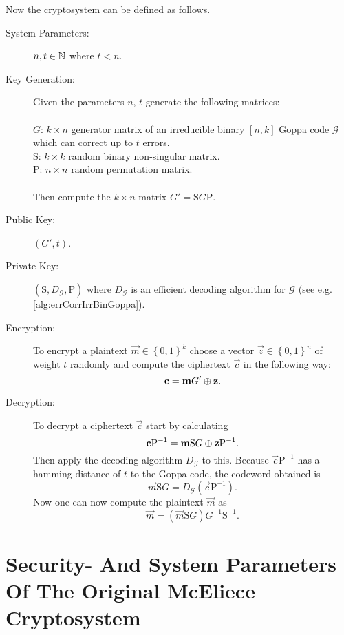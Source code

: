 Now the cryptosystem can be defined as follows.
\begin{description}
	\item[System Parameters:] $n, t \in \mathbb{N}$ where $t < n$.
	\item[Key Generation:] Given the parameters $n$, $t$ generate the following matrices:
	\\~\\
		$G$: $k \times n$ generator matrix of an irreducible binary $\left[n,k\right]$ Goppa code $\mathcal{G}$ which can correct up to $t$ errors.\\
		$\mathrm{S}$: $k \times k$ random binary non-singular matrix.\\
		$\mathrm{P}$: $n \times n$ random permutation matrix.
		\\~\\
		Then compute the $k \times n$ matrix $G' = \mathrm{S}G\mathrm{P}$.
	\item[Public Key:] $\left(G',t\right)$.
	\item[Private Key:] $\left(\mathrm{S}, D_{\mathcal{G}}, \mathrm{P}\right)$ where $D_{\mathcal{G}}$ is an efficient decoding algorithm for $\mathcal{G}$ (see e.g. \cref{alg:errCorrIrrBinGoppa}).
	\item[Encryption:] To encrypt a plaintext $\vec{m} \in \left\{ 0,1 \right\} ^k$ choose a vector $\vec{z} \in \left\{ 0,1 \right\} ^n$ of weight $t$ randomly and compute the ciphertext $\vec{c}$ in the following way:
		\begin{equation}
		\label{eq:mcEEncryption}
			\boldsymbol{\mathrm{c}} = \boldsymbol{\mathrm{m}} G' \mathbin{\oplus} \boldsymbol{\mathrm{z}}.
		\end{equation}
	\item[Decryption:] To decrypt a ciphertext $\vec{c}$ start by calculating
		\[
			\boldsymbol{\mathrm{c}}\mathrm{P}^{-1} = \boldsymbol{\mathrm{m}}\mathrm{S}G \mathbin{\oplus} \boldsymbol{\mathrm{z}}\mathrm{P}^{-1}.
		\]
		Then apply the decoding algorithm $D_{\mathcal{G}}$ to this. Because $\vec{c}\mathrm{P}^{-1}$ has a hamming distance of $t$ to the Goppa code, the codeword obtained is
		\[
			\vec{m}\mathrm{S}G = D_{\mathcal{G}} \left( \vec{c}\mathrm{P}^{-1} \right).
		\]
		Now one can now compute the plaintext $\vec{m}$ as
		\[
			\vec{m} = \left( \vec{m}\mathrm{S}G \right)  G^{-1} \mathrm{S}^{-1}.
		\]
\end{description}


\section{Security- And System Parameters Of The Original McEliece Cryptosystem}
\label{sec:secSysParOMC}

